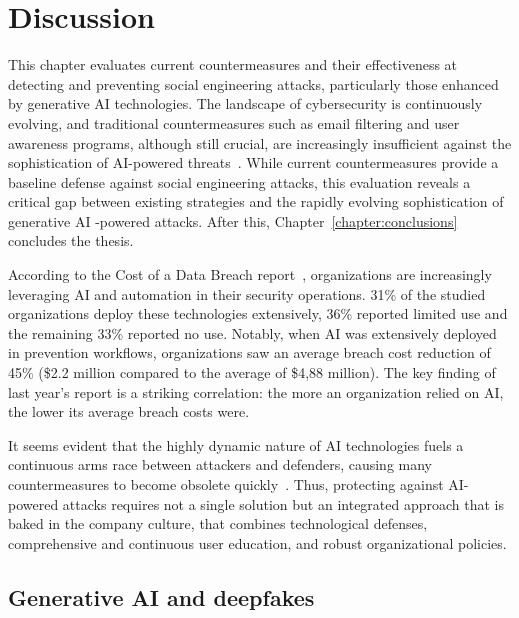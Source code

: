 \chapter{Discussion\label{chapter:discussion}}
\begin{comment}
\end{comment}

This chapter evaluates current countermeasures and their effectiveness at detecting and preventing social engineering attacks, particularly those enhanced by generative AI technologies. The landscape of cybersecurity is continuously evolving, and traditional countermeasures such as email filtering and user awareness programs, although still crucial, are increasingly insufficient against the sophistication of AI-powered threats~\citep{fakhouri_AI_Driven_Solutions_SE_Attacks_2024}. While current countermeasures provide a baseline defense against social engineering attacks, this evaluation reveals a critical gap between existing strategies and the rapidly evolving sophistication of generative AI -powered attacks. After this, Chapter~\ref{chapter:conclusions} concludes the thesis.

According to the Cost of a Data Breach report~\citep{ibm_Cost_Data_Breach_Report_2024}, organizations are increasingly leveraging AI and automation in their security operations. 31\% of the studied organizations deploy these technologies extensively, 36\% reported limited use and the remaining 33\% reported no use. Notably, when AI was extensively deployed in prevention workflows, organizations saw an average breach cost reduction of 45\% (\$2.2 million compared to the average of \$4,88 million). The key finding of last year's report is a striking correlation: the more an organization relied on AI, the lower its average breach costs were.

It seems evident that the highly dynamic nature of AI technologies fuels a continuous arms race between attackers and defenders, causing many countermeasures to become obsolete quickly~\citep{fakhouri_AI_Driven_Solutions_SE_Attacks_2024}. Thus, protecting against AI-powered attacks requires not a single solution but an integrated approach that is baked in the company culture, that combines technological defenses, comprehensive and continuous user education, and robust organizational policies.

\section{Generative AI and deepfakes}
\begin{comment}
\end{comment}

